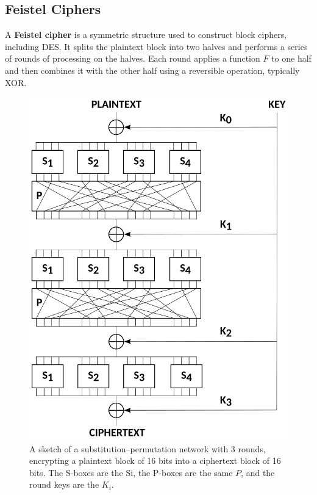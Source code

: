 \subsection{Feistel Ciphers}
\begin{defn}
A \textbf{Feistel cipher} is a symmetric structure used to construct block ciphers, including DES. It splits the plaintext block into two halves and performs a series of rounds of processing on the halves. Each round applies a function $F$ to one half and then combines it with the other half using a reversible operation, typically XOR.
\end{defn}

\begin{figure}[h!]
    \centering
    \begin{minipage}[t]{0.35\textwidth}
        \centering
        \vspace{0pt} %
        \includegraphics[width=\textwidth]{img/spn.png}
        \caption{A sketch of a substitution–permutation network with 3 rounds, encrypting a plaintext block of 16 bits into a ciphertext block of 16 bits. The S-boxes are the Si, the P-boxes are the same $P$, and the round keys are the $K_i$.}

\end{minipage}
\end{figure}
